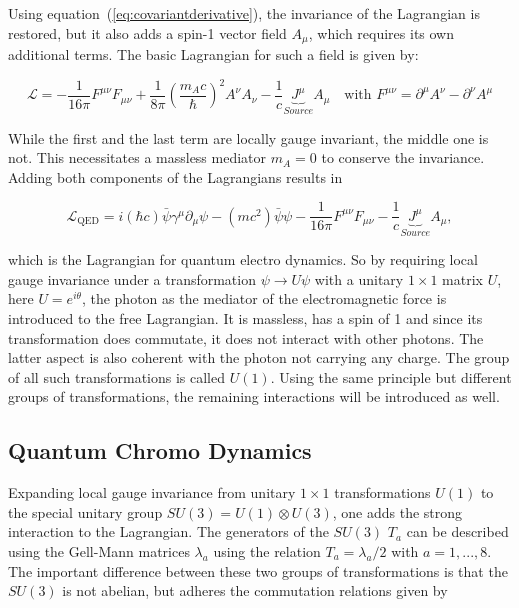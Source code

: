 \noindent Using equation~(\ref{eq:covariantderivative}), the invariance of the Lagrangian is restored, but it also adds a spin-1 vector field $A_\mu$, which requires its own additional terms. The basic Lagrangian for such a field is given by:

\begin{equation}
  \label{eq:procalagrangian}
  \mathcal{L} = - \frac{1}{16 \pi} F^{\mu \nu} F_{\mu \nu} + \frac{1}{8 \pi} \left( \frac{m_A c}{\hbar} \right)^2 A^\nu A_\nu - \frac{1}{c} \underbrace{J^\mu}_{Source} A_\mu \quad \text{with } F^{\mu \nu} = \partial^\mu A^\nu - \partial^\nu A^\mu
\end{equation}

\noindent While the first and the last term are locally gauge invariant, the middle one is not. This necessitates a massless mediator $m_A = 0$ to conserve the invariance. Adding both components of the Lagrangians results in

\begin{equation}
  \label{eq:qedlagrangian}
  \mathcal{L}_{\text{QED}} = i (\hbar c) \bar{\psi} \gamma^\mu \partial_\mu \psi - (m c^2) \bar{\psi} \psi - \frac{1}{16 \pi} F^{\mu \nu} F_{\mu \nu} - \frac{1}{c} \underbrace{J^\mu}_{Source} A_\mu,
\end{equation}

\noindent which is the Lagrangian for quantum electro dynamics. So by requiring local gauge invariance under a transformation $\psi \rightarrow U \psi$ with a unitary $1 \times 1$ matrix $U$, here $U = e^{i \theta}$, the photon as the mediator of the electromagnetic force is introduced to the free Lagrangian. It is massless, has a spin of 1 and since its transformation does commutate, it does not interact with other photons. The latter aspect is also coherent with the photon not carrying any charge. The group of all such transformations is called $U(1)$. Using the same principle but different groups of transformations, the remaining interactions will be introduced as well.

\subsection{Quantum Chromo Dynamics}
\label{sec:qcd}

Expanding local gauge invariance from unitary $1 \times 1$ transformations $U(1)$ to the special unitary group $SU(3) = U(1) \otimes U(3)$, one adds the strong interaction to the Lagrangian. The generators of the $SU(3)$ $T_a$ can be described using the Gell-Mann matrices $\lambda_a$ using the relation $T_a = \lambda_a / 2$ with $a = 1, ..., 8$. The important difference between these two groups of transformations is that the $SU(3)$ is not abelian, but adheres the commutation relations given by

